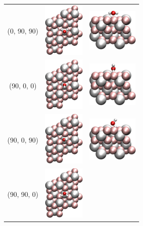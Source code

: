 \documentclass[11pt,DIV=13,BCOR=5mm,a4paper,headinclude]{scrbook}
\begin{document}
\begin{table}[!h]
\begin{tabular}{cp{4cm}p{4cm}}
(0, 90, 90) & \includegraphics[width=2cm,angle=90]{figures/0001/Ausrichtungsbilder/0_90_90-toptest.png} 
& \includegraphics[width=2.5cm]{figures/0001/Ausrichtungsbilder/0_90_90-sidetest.png}\\
(90, 0, 0) &\includegraphics[width=2cm,angle=90]{figures/0001/Ausrichtungsbilder/90_0_0-toptest.png} 
& \includegraphics[width=2.5cm]{figures/0001/Ausrichtungsbilder/90_0_0-sidetest.png}\\
(90, 0, 90) & \includegraphics[width=2cm,angle=90]{figures/0001/Ausrichtungsbilder/90_0_90-toptest.png} 
& \includegraphics[width=2.5cm]{figures/0001/Ausrichtungsbilder/90_0_90-sidetest.png}\\
(90, 90, 0) &\includegraphics[width=2cm,angle=90]{figures/0001/Ausrichtungsbilder/90_90_0-toptest.png} 

\end{tabular}
\end{table}
\end{document}

